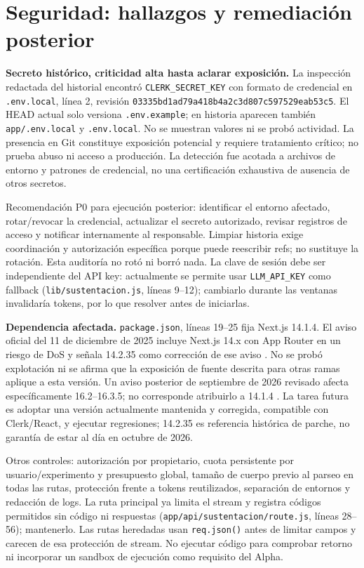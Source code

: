 \documentclass[11pt,a4paper]{report}
\newcommand{\src}[2]{\nolinkurl{#1}, líneas #2}
\begin{document}
\section{Seguridad: hallazgos y remediación posterior}
\textbf{Secreto histórico, criticidad alta hasta aclarar exposición.} La inspección redactada del historial encontró \texttt{CLERK\_SECRET\_KEY} con formato de credencial en \nolinkurl{.env.local}, línea 2, revisión \nolinkurl{03335bd1ad79a418b4a2c3d807c597529eab53c5}. El HEAD actual solo versiona \nolinkurl{.env.example}; en historia aparecen también \nolinkurl{app/.env.local} y \nolinkurl{.env.local}. No se muestran valores ni se probó actividad. La presencia en Git constituye exposición potencial y requiere tratamiento crítico; no prueba abuso ni acceso a producción. La detección fue acotada a archivos de entorno y patrones de credencial, no una certificación exhaustiva de ausencia de otros secretos.

Recomendación P0 para ejecución posterior: identificar el entorno afectado, rotar/revocar la credencial, actualizar el secreto autorizado, revisar registros de acceso y notificar internamente al responsable. Limpiar historia exige coordinación y autorización específica porque puede reescribir refs; no sustituye la rotación. Esta auditoría no rotó ni borró nada. La clave de sesión debe ser independiente del API key: actualmente se permite usar \texttt{LLM\_API\_KEY} como fallback (\src{lib/sustentacion.js}{9--12}); cambiarlo durante las ventanas invalidaría tokens, por lo que resolver antes de iniciarlas.

\textbf{Dependencia afectada.} \src{package.json}{19--25} fija Next.js 14.1.4. El aviso oficial del 11 de diciembre de 2025 incluye Next.js 14.x con App Router en un riesgo de DoS y señala 14.2.35 como corrección de ese aviso \cite{nextsecurity}. No se probó explotación ni se afirma que la exposición de fuente descrita para otras ramas aplique a esta versión. Un aviso posterior de septiembre de 2026 revisado afecta específicamente 16.2--16.3.5; no corresponde atribuirlo a 14.1.4 \cite{next2026}. La tarea futura es adoptar una versión actualmente mantenida y corregida, compatible con Clerk/React, y ejecutar regresiones; 14.2.35 es referencia histórica de parche, no garantía de estar al día en octubre de 2026.

Otros controles: autorización por propietario, cuota persistente por usuario/experimento y presupuesto global, tamaño de cuerpo previo al parseo en todas las rutas, protección frente a tokens reutilizados, separación de entornos y redacción de logs. La ruta principal ya limita el stream y registra códigos permitidos sin código ni respuestas (\src{app/api/sustentacion/route.js}{28--56}); mantenerlo. Las rutas heredadas usan \texttt{req.json()} antes de limitar campos y carecen de esa protección de stream. No ejecutar código para comprobar retorno ni incorporar un sandbox de ejecución como requisito del Alpha.
\end{document}
